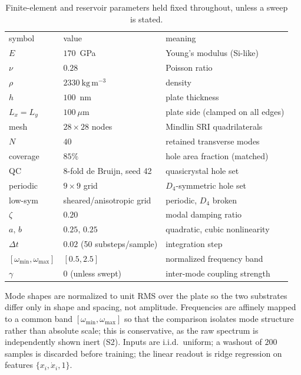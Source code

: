 \documentclass[aps,prapplied,reprint,amsmath,amssymb,floatfix]{revtex4-2}
\begin{document}
\begin{table}[h]
\caption{Finite-element and reservoir parameters held fixed throughout, unless
a sweep is stated.}
\label{tab:params}
\begin{ruledtabular}
\begin{tabular}{lll}
symbol & value & meaning \\
\colrule
$E$        & $170$~GPa                 & Young's modulus (Si-like) \\
$\nu$      & $0.28$                    & Poisson ratio \\
$\rho$     & $2330~\mathrm{kg\,m^{-3}}$& density \\
$h$        & $100$~nm                  & plate thickness \\
$L_x=L_y$  & $100~\mu$m                & plate side (clamped on all edges) \\
mesh       & $28\times28$ nodes        & Mindlin SRI quadrilaterals \\
$N$        & $40$                      & retained transverse modes \\
coverage   & $85\%$                    & hole area fraction (matched) \\
QC         & 8-fold de Bruijn, seed 42 & quasicrystal hole set \\
periodic   & $9\times9$ grid           & $D_4$-symmetric hole set \\
low-sym    & sheared/anisotropic grid  & periodic, $D_4$ broken \\
$\zeta$    & $0.20$                    & modal damping ratio \\
$a,\,b$    & $0.25,\,0.25$             & quadratic, cubic nonlinearity \\
$\Delta t$ & $0.02$ (50 substeps/sample) & integration step \\
$[\omega_{\min},\omega_{\max}]$ & $[0.5,2.5]$ & normalized frequency band \\
$\gamma$   & $0$ (unless swept)        & inter-mode coupling strength \\
\end{tabular}
\end{ruledtabular}
\end{table}

Mode shapes are normalized to unit RMS over the plate so the two substrates
differ only in shape and spacing, not amplitude. Frequencies are affinely
mapped to a common band $[\omega_{\min},\omega_{\max}]$ so that the comparison
isolates mode structure rather than absolute scale; this is conservative, as
the raw spectrum is independently shown inert (S2). Inputs are i.i.d.\ uniform;
a washout of $200$ samples is discarded before training; the linear readout is
ridge regression on features $\{x_i,\dot x_i,1\}$.
\end{document}
